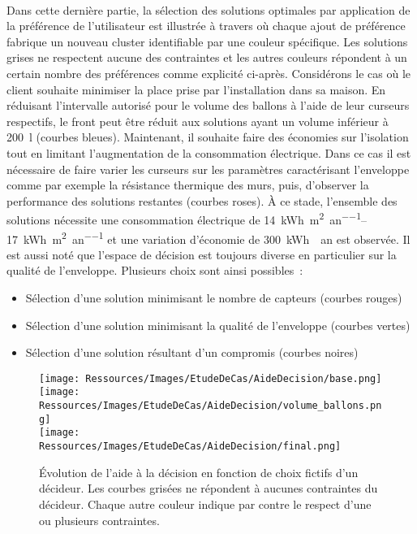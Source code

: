 \paragraph{} %
Dans cette dernière partie, la sélection des solutions optimales par application de la
préférence de l’utilisateur est illustrée à travers  où chaque
ajout de préférence fabrique un nouveau cluster identifiable par une couleur spécifique.
Les solutions grises ne respectent aucune des contraintes et les autres couleurs répondent à
un certain nombre des préférences comme explicité ci-après. Considérons le cas où le
client souhaite minimiser la place prise par l’installation dans sa maison. En réduisant
l’intervalle autorisé pour le volume des ballons à l’aide de leur curseurs respectifs, le
front peut être réduit aux solutions ayant un volume inférieur à \SI{200}{\litre} (courbes
bleues). Maintenant, il souhaite faire des économies sur l’isolation tout en limitant
l’augmentation de la consommation électrique. Dans ce cas il est nécessaire de faire
varier les curseurs sur les paramètres caractérisant l’enveloppe comme par exemple la
résistance thermique des murs, puis, d’observer la performance des solutions restantes
(courbes roses). À ce stade, l’ensemble des solutions nécessite une consommation
électrique de \SIrange{14}{17}{kWh\per\m^{2}\per an} et une variation d’économie de
\SI{300}{kWh \per an} est observée. Il est aussi noté que l’espace de décision est
toujours diverse en particulier sur la qualité de l’enveloppe. Plusieurs choix sont ainsi
possibles~:
\begin{itemize}
  \item Sélection d’une solution minimisant le nombre de capteurs (courbes rouges)
  \item Sélection d’une solution minimisant la qualité de l’enveloppe (courbes vertes)
  \item Sélection d’une solution résultant d’un compromis (courbes noires)
\end{itemize}

\begin{figure}
    \centering
    \texttt{[image: Ressources/Images/EtudeDeCas/AideDecision/base.png]}
    \\
    \texttt{[image: Ressources/Images/EtudeDeCas/AideDecision/volume\_ballons.png]}
    \\
    \texttt{[image: Ressources/Images/EtudeDeCas/AideDecision/final.png]}
    \caption[Évolution de l’aide à la décision en fonction de choix fictif d’un décideur]
             {Évolution de l’aide à la décision en fonction de choix fictifs d’un décideur. Les courbes grisées ne répondent à
             aucunes contraintes du décideur. Chaque autre couleur indique par contre le respect d’une ou plusieurs contraintes.}
    \label{fig:xdat_exemple}
\end{figure}


